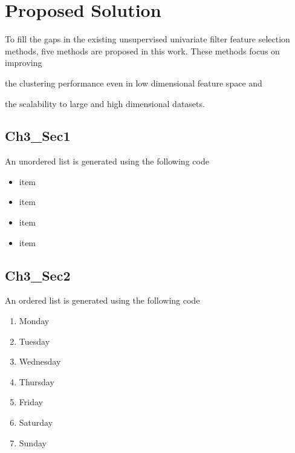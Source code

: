 \chapter{Proposed Solution}
To fill the gaps in the existing unsupervised univariate filter feature selection methods, five methods are proposed in this work. These methods focus on improving 
\begin{inparaenum}
    \item the clustering performance even in low dimensional feature space and

    \item the scalability to large and high dimensional datasets.   
\end{inparaenum}

\section{Ch3\_Sec1}
An unordered list is generated using the following code
\begin{itemize}
    \item item
    \item item
    \item item
    \item item
\end{itemize}

\section{Ch3\_Sec2}

An ordered list is generated using the following code
\begin{enumerate}
    \item Monday
    \item Tuesday
    \item Wednesday
    \item Thursday
    \item Friday
    \item Saturday
    \item Sunday
\end{enumerate}









